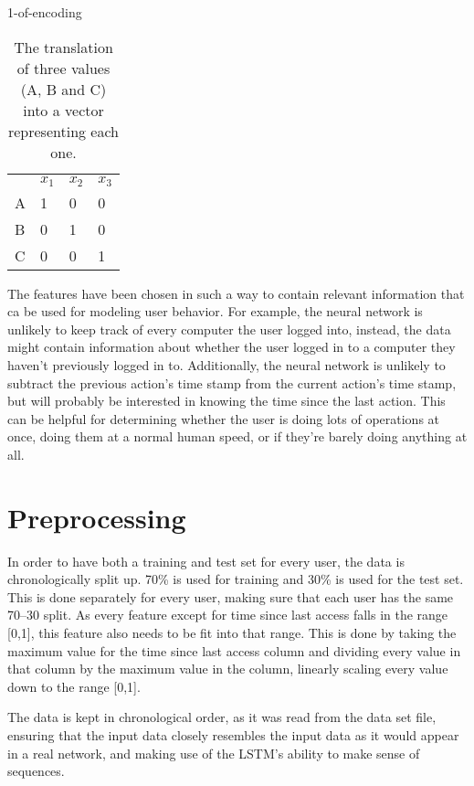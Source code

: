 \begin{table}[htbpH]
	\centering
	\caption{1-of-encoding}\label{tab:one_of_encoding}
	\begin{tabular}{llll}
		& \(x_1\) & \(x_2\) & \(x_3\)                   \\ \cline{2-4} 
\multicolumn{1}{l|}{A} & 1    & 0    & \multicolumn{1}{l|}{0} \\
\multicolumn{1}{l|}{B} & 0    & 1    & \multicolumn{1}{l|}{0} \\
\multicolumn{1}{l|}{C} & 0    & 0    & \multicolumn{1}{l|}{1}
	\end{tabular}
	\caption{The translation of three values (A, B and C) into a vector representing each one.}
\end{table}


The features have been chosen in such a way to contain relevant information that ca be used for modeling user behavior. For example, the neural network is unlikely to keep track of every computer the user logged into, instead, the data might contain information about whether the user logged in to a computer they haven't previously logged in to. Additionally, the neural network is unlikely to subtract the previous action's time stamp from the current action's time stamp, but will probably be interested in knowing the time since the last action. This can be helpful for determining whether the user is doing lots of operations at once, doing them at a normal human speed, or if they're barely doing anything at all.

\section{Preprocessing}
In order to have both a training and test set for every user, the data is chronologically split up. 70\% is used for training and 30\% is used for the test set. This is done separately for every user, making sure that each user has the same 70--30 split. As every feature except for time since last access falls in the range [0,1], this feature also needs to be fit into that range. This is done by taking the maximum value for the time since last access column and dividing every value in that column by the maximum value in the column, linearly scaling every value down to the range [0,1].

The data is kept in chronological order, as it was read from the data set file, ensuring that the input data closely resembles the input data as it would appear in a real network, and making use of the LSTM's ability to make sense of sequences.

